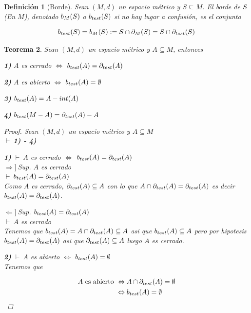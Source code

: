 \documentclass[oneside]{book} %
\theoremstyle{Teorema}
\newtheorem{Definicion}{Definición}[chapter]
\newtheorem{Teorema}[Definicion]{Teorema}
\theoremstyle{Ejemplos}
\theoremstyle{[Obs]}
\def \test {test}
\newcommand{\frontera}[2][\test]{\ifx \test #1 {\partial(#2)} \else {\partial_{#1}(#2)} \fi} %
\newcommand{\borde}[2][\test]{\ifx \test #1 {b(#2)} \else {b_{#1}(#2)} \fi} %
\renewcommand{\{}{\left\lbrace} %
\renewcommand{\}}{\right\rbrace} %
\newcommand{\n}{\cap} %
\renewcommand{\sc}{\subseteq} %
\newcommand{\pd}{$\vdash\ $} %
\newcommand{\necesidad}{$\Rightarrow]\ $} %
\newcommand{\suficiencia}{$\Leftarrow]\ $} %
\begin{document}
			\begin{Definicion}[Borde]\setlength{\parindent}{0em}
				
				Sean $(M, d)$ un espacio métrico y $S \sc M$. El borde de $S$ (En $M$), denotado $\borde[M]{S}$ o $\borde{S}$ si no hay lugar a confusión, es el conjunto 
				
				\[ \borde{S} = \borde[M]{S} := S \n \frontera[M]{S} = S \n \frontera{S} \] 

			\end{Definicion}

			\begin{Teorema}\setlength{\parindent}{0em}
				
				Sean $(M, d)$ un espacio métrico y $A \sc M$, entonces 

				\textbf{1)} $A$ es cerrado $\Leftrightarrow$ $\borde{A} = \frontera{A}$ 

				\textbf{2)} $A$ es abierto $\Leftrightarrow$ $\borde{A} = \emptyset$ 

				\textbf{3)} $\borde{A} = A - int(A)$ 

				\textbf{4)} $\borde{M - A} = \frontera{A} - A$ 

				\begin{proof}
					
					Sean $(M, d)$ un espacio métrico y $A \sc M$ \\ 
					\pd \textbf{1) - 4)}

					\textbf{1)} \pd $A$ es cerrado $\Leftrightarrow$ $\borde{A} = \frontera{A}$ \\ 
					\necesidad Sup. $A$ es cerrado \\ 
					\pd $\borde{A} = \frontera{A}$ \\ 
					Como $A$ es cerrado, $\frontera{A} \sc A$ con lo que $A \n \frontera{A} = \frontera{A}$ es decir $\borde{A} = \frontera{A}$.

					\suficiencia Sup. $\borde{A} = \frontera{A}$ \\ 
					\pd $A$ es cerrado \\ 
					Tenemos que $\borde{A} = A \n \frontera{A} \sc A$ asi que $\borde{A} \sc A$ pero por hipotesis $\borde{A} = \frontera{A}$ asi que $\frontera{A} \sc A$ luego $A$ es cerrado.

					\textbf{2)} \pd $A$ es abierto $\Leftrightarrow$ $\borde{A} = \emptyset$ \\ 
					Tenemos que 

					\begin{align*}
						A \text{ es abierto } & \Leftrightarrow A \n \frontera{A} = \emptyset \\ 
						& \Leftrightarrow \borde{A} = \emptyset
					\end{align*}


\end{proof}
\end{Teorema}
\end{document}
